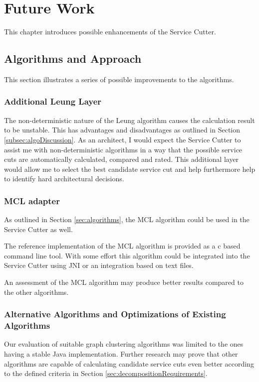 \chapter{Future Work}
\label{cha:futureWork}

This chapter introduces possible enhancements of the Service Cutter. 

\section{Algorithms and Approach}

This section illustrates a series of possible improvements to the algorithms.

\subsection{Additional Leung Layer}

The non-deterministic nature of the Leung algorithm causes the calculation result to be unstable. This has advantages and disadvantages as outlined in Section \ref{subsec:algoDiscussion}. As an architect, I would expect the Service Cutter to assist me with non-deterministic algorithms in a way that the possible service cuts are automatically calculated, compared and rated. This additional layer would allow me to select the best candidate service cut and help furthermore help to identify hard architectural decisions.

\subsection{MCL adapter}
\label{subsec:mclAdapter}

As outlined in Section \ref{sec:algorithms}, the MCL algorithm could be used in the Service Cutter as well.

The reference implementation of the MCL algorithm is provided as a \gls{c} based command line tool. With some effort this algorithm could be integrated into the Service Cutter using \gls{JNI} or an integration based on text files.

An assessment of the MCL algorithm may produce better results compared to the other algorithms.

\subsection{Alternative Algorithms and Optimizations of Existing Algorithms}

Our evaluation of suitable graph clustering algorithms was limited to the ones having a stable Java implementation. Further research may prove that other algorithms are capable of calculating candidate service cuts even better according to the defined criteria in Section \ref{sec:decompositionRequirements}.

